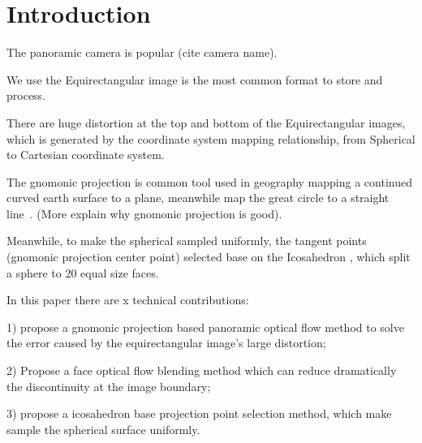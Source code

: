 \section{Introduction}\label{sec:intro}

The panoramic camera is popular (cite camera name).

We use the Equirectangular image is the most common format to store and process.

There are huge distortion at the top and bottom of the Equirectangular images, which is generated by the coordinate system mapping relationship, from Spherical to Cartesian coordinate system.

The gnomonic projection is common tool used in geography mapping a continued curved earth surface to a plane, meanwhile map the great circle to a straight line~\cite{todo}. (More explain why gnomonic projection is good).

Meanwhile, to make the spherical sampled uniformly, the tangent points (gnomonic projection center point) selected base on the Icosahedron , which split a sphere to 20 equal size faces.

In this paper there are x technical contributions:

1) propose a gnomonic projection based panoramic optical flow method to solve the error caused by the equirectangular image's large distortion;

2) Propose a face optical flow blending method which can reduce dramatically the discontinuity at the image boundary;

3) propose a icosahedron base projection point selection method, which make sample the spherical surface uniformly.



